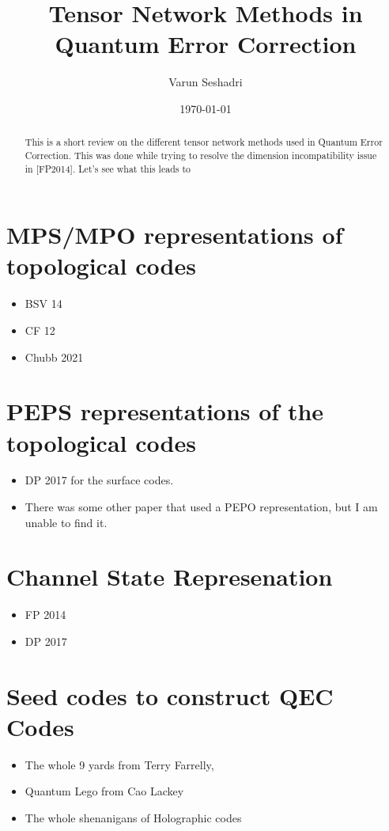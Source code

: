 \documentclass[%
 reprint,
amsmath,amssymb,
aps,
pra,
]{revtex4-2}
\begin{document}

\title{Tensor Network Methods in Quantum Error Correction}%

\author{Varun Seshadri }

\date{\today}

\begin{abstract}
    This is a short review on the different tensor network methods used in Quantum Error Correction.
    This was done while trying to resolve the dimension incompatibility issue in [FP2014]. Let's see what this leads to

\end{abstract}

\maketitle

\section{MPS/MPO representations of topological codes}
\begin{itemize}
    \item BSV 14
    \item CF 12
    \item Chubb 2021
\end{itemize}


\section{PEPS representations of the topological codes}
\begin{itemize}
    \item DP 2017 for the surface codes.
    \item There was some other paper that used a PEPO representation, but I am unable to find it.
\end{itemize}

\section{Channel State Represenation}
\begin{itemize}
    \item FP 2014
    \item DP 2017
\end{itemize}

\section{Seed codes to construct QEC Codes}
\begin{itemize}
    \item The whole 9 yards from Terry Farrelly,
    \item Quantum Lego from Cao Lackey
    \item The whole shenanigans of Holographic codes
\end{itemize}
\end{document}
